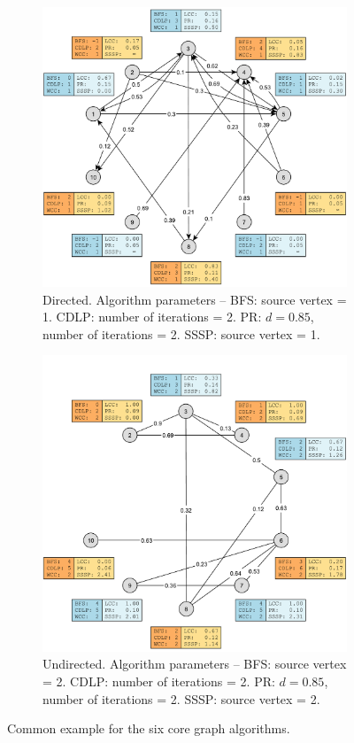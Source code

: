 \begin{figure}[h]
	\centering
	\begin{subfigure}{\textwidth}
		\centering
		\includegraphics[scale=\examplescale]{figures/examples/common-dir.pdf}
		\caption{Directed. Algorithm parameters --
			BFS: source vertex = 1.
			CDLP: number of iterations = 2.
			PR: $d = 0.85$, number of iterations = 2.
			SSSP: source vertex = 1.}
	\end{subfigure}
	\begin{subfigure}{\textwidth}
		\centering
		\includegraphics[scale=\examplescale]{figures/examples/common-undir.pdf}
		\caption{Undirected. Algorithm parameters --
			BFS: source vertex = 2.
			CDLP: number of iterations = 2.
			PR: $d = 0.85$, number of iterations = 2.
			SSSP: source vertex = 2.}
	\end{subfigure}
	\caption{Common example for the six core graph algorithms.}
	\label{fig:common_example}
\end{figure}
